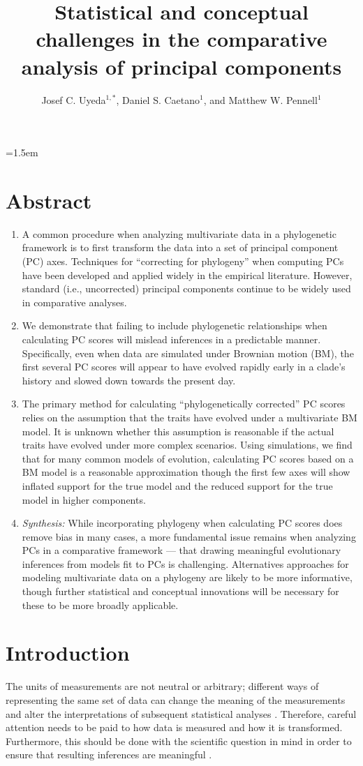 \documentclass[a4paper,12pt]{article}
\title{Statistical and conceptual challenges in the comparative analysis of principal components}
\author{
Josef C. Uyeda$^{1,*}$, Daniel S. Caetano$^1$, and Matthew W. Pennell$^1$
}
\date{}
\affiliation{
 $^{1}$ Department of Biological Sciences \& Institute for Bioinformatics and Evolutionary Studies, University of Idaho, Moscow, ID 83844, U.S.A.\\ 
 $^{*}$ Email for correspondence: \texttt{pseudacris@gmail.com}\\
}
\begin{document}
\mstitlepage
\parindent=1.5em
\addtolength{\parskip}{.3em}
\vfill

\section{Abstract}
\begin{enumerate}
\item A common procedure when analyzing multivariate data in a phylogenetic framework is to first transform the data into a set of principal component (PC) axes. Techniques for ``correcting for phylogeny'' when computing PCs have been developed and applied widely in the empirical literature. However, standard (i.e., uncorrected) principal components continue to be widely used in comparative analyses.

\item We demonstrate that failing to include phylogenetic relationships when calculating PC scores will mislead inferences in a predictable manner. Specifically, even when data are simulated under Brownian motion (BM), the first several PC scores will appear to have evolved rapidly early in a clade's history and slowed down towards the present day.

\item The primary method for calculating ``phylogenetically corrected'' PC scores relies on the assumption that the traits have evolved under a multivariate BM model. It is unknown whether this assumption is reasonable if the actual traits have evolved under more complex scenarios. Using simulations, we find that for many common models of evolution, calculating PC scores based on a BM model is a reasonable approximation though the first few axes will show inflated support for the true model and the reduced support for the true model in higher components.

\item \emph{Synthesis:} While incorporating phylogeny when calculating PC scores does remove bias in many cases, a more fundamental issue remains when analyzing PCs in a comparative framework --- that drawing meaningful evolutionary inferences from models fit to PCs is challenging. Alternatives approaches for modeling multivariate data on a phylogeny are likely to be more informative, though further statistical and conceptual innovations will be necessary for these to be more broadly applicable.
\end{enumerate} 

\newpage

\section{Introduction}
The units of measurements are not neutral or arbitrary; different ways of representing the same set of data can change the meaning of the measurements and alter the interpretations of subsequent statistical analyses \citep{Hand2004, HansenHoule2008, Houle2011}. Therefore, careful attention needs to be paid to how data is measured and how it is transformed. Furthermore, this should be done with the scientific question in mind in order to ensure that resulting inferences are meaningful \citep{Houle2011}. 
\end{document}
